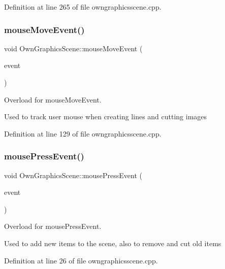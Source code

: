 Definition at line 265 of file owngraphicsscene.\+cpp.

\mbox{\label{classOwnGraphicsScene_ac7f6be2800f09463413459fed74bf34e}} 
\subsubsection{\texorpdfstring{mouse\+Move\+Event()}{mouseMoveEvent()}}
{\footnotesize\ttfamily void Own\+Graphics\+Scene\+::mouse\+Move\+Event (\begin{DoxyParamCaption}\item[{Q\+Graphics\+Scene\+Mouse\+Event $\ast$}]{event }\end{DoxyParamCaption})}



Overload for mouse\+Move\+Event. 

Used to track user mouse when creating lines and cutting images 

Definition at line 129 of file owngraphicsscene.\+cpp.

\mbox{\label{classOwnGraphicsScene_a1a9916971af608d5331483606f72fbe4}} 
\subsubsection{\texorpdfstring{mouse\+Press\+Event()}{mousePressEvent()}}
{\footnotesize\ttfamily void Own\+Graphics\+Scene\+::mouse\+Press\+Event (\begin{DoxyParamCaption}\item[{Q\+Graphics\+Scene\+Mouse\+Event $\ast$}]{event }\end{DoxyParamCaption})}



Overload for mouse\+Press\+Event. 

Used to add new items to the scene, also to remove and cut old items 

Definition at line 26 of file owngraphicsscene.\+cpp.

\mbox{\label{classOwnGraphicsScene_a5b4b466a697f83c23294a80067edac23}} 
